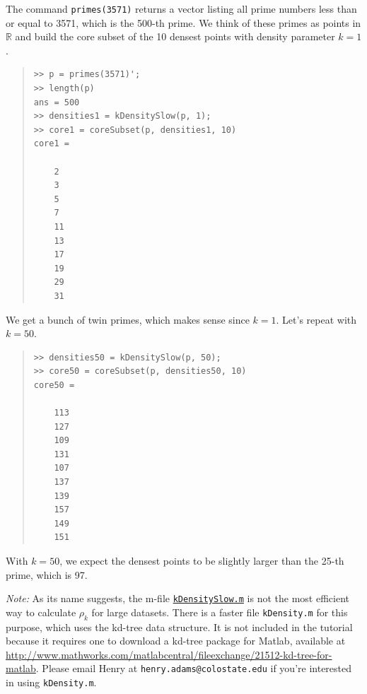 \documentclass[amscd, amssymb, verbatim]{amsart}[12pt]
\theoremstyle{remark}
\theoremstyle{remark}
\theoremstyle{remark}
\newcommand{\R}{\mathbb{R}}
\begin{document}
The command \texttt{primes(3571)} returns a vector listing all prime numbers less than or equal to 3571, which is the 500-th prime. We think of these primes as points in $\R$ and build the core subset of the 10 densest points with density parameter $k = 1$.
\begin{quote} \begin{verbatim} 
>> p = primes(3571)';
>> length(p)
ans = 500
>> densities1 = kDensitySlow(p, 1);
>> core1 = coreSubset(p, densities1, 10)
core1 =

    2
    3
    5
    7
    11
    13
    17
    19
    29
    31
\end{verbatim} \end{quote}

We get a bunch of twin primes, which makes sense since $k = 1$. Let's repeat with $k = 50$.

\begin{quote} \begin{verbatim}
>> densities50 = kDensitySlow(p, 50);
>> core50 = coreSubset(p, densities50, 10)
core50 =

    113
    127
    109
    131
    107
    137
    139
    157
    149
    151
\end{verbatim} \end{quote}
 
With $k = 50$, we expect the densest points to be slightly larger than the 25-th prime, which is 97. 

{\em Note:} As its name suggests, the m-file \href{https://github.com/appliedtopology/javaplex/tree/master/src/matlab/for_distribution/tutorial_examples/kDensitySlow.m}{\texttt{kDensitySlow.m}} is not the most efficient way to calculate $\rho_k$ for large datasets. There is a faster file \texttt{kDensity.m} for this purpose, which uses the kd-tree data structure. It is not included in the tutorial because it requires one to download a kd-tree package for Matlab, available at \url{http://www.mathworks.com/matlabcentral/fileexchange/21512-kd-tree-for-matlab}. Please email Henry at \texttt{henry.adams@colostate.edu} if you're interested in using \texttt{kDensity.m}. 


\end{document}
